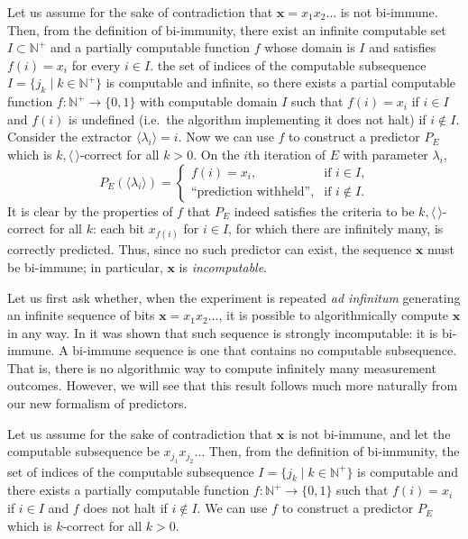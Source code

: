 \documentclass[%
 superscriptaddress,
 preprint,
 showpacs,
 showkeys,
 preprintnumbers,
  amsmath,amssymb,
  aps,
 pra,
  longbibliography,
  floatfix,
 ]{revtex4-1}
\theoremstyle{definition}
\newcommand{\N}{\mathbb{N}}%
\newcommand{\x}{\mathbf{x}}
\begin{document}
Let us assume for the sake of contradiction that $\x=x_1x_2\dots$ is not bi-immune.  %
Then, from the definition of bi-immunity, there exist an infinite computable set $I \subset \N^+$ and a partially computable function $f$ whose domain is
$I$ and satisfies $f(i)=x_i$ for every $i\in I$.
the set of indices of the computable subsequence $I=\{j_k \mid k\in\N^+\}$ is computable and infinite, so there exists a partial computable function $f:\N^+ \to \{0,1\}$ with computable domain $I$ such that $f(i)=x_i$ if $i\in I$ and $f(i)$ is undefined (i.e.\ the algorithm implementing it does not halt) if $i\notin I$.
\fi
Consider the extractor $\langle \lambda_i\rangle = i$.
 Now we can use $f$ to construct a predictor $P_E$ which is $k,\langle \, \rangle$-correct for all $k>0$. On the $i$th iteration of $E$ with parameter $\lambda_i$, $$P_E(\langle\lambda_i\rangle)=\begin{cases}f(i)=x_i, & \text{if $i\in I$,}\\\text{``{prediction withheld}'',} & \text{if $i\notin I$.}\end{cases}$$
It is clear by the properties of $f$ that $P_E$ indeed satisfies the criteria to be $k,\langle \, \rangle$-correct for all $k$:
each bit $x_{f(i)}$ for $i\in I$, for which there are infinitely many, is correctly predicted.
Thus, since no such predictor can exist, the sequence $\x$ must be bi-immune; in particular,   $\x$ is {\em incomputable}.

Let us first ask whether, when the experiment is repeated \emph{ad infinitum} generating an infinite sequence of bits $\x=x_1x_2\dots$, it is possible to algorithmically compute $\x$ in any way.
In \cite{svozil-2006-ran,2012-incomput-proofsCJ} it was shown that such sequence is strongly incomputable: it is bi-immune.
A bi-immune sequence is one that contains no computable subsequence.
That is, there is no algorithmic way to compute infinitely many measurement outcomes.
However, we will see that this result follows much more naturally from our new formalism of predictors.

Let us assume for the sake of contradiction that $\x$ is not bi-immune, and let the computable subsequence be $x_{j_1}x_{j_2}\dots$
Then, from the definition of bi-immunity, the set of indices of the computable subsequence $I=\{j_k \mid k\in\N^+\}$ is computable and there exists a partially computable function $f:\N^+ \to \{0,1\}$ such that $f(i)=x_i$ if $i\in I$ and $f$ does not halt if $i\notin I$.
We can use $f$ to construct a predictor $P_E$ which is $k$-correct for all $k>0$.
\end{document}

